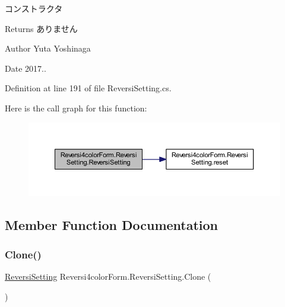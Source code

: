 コンストラクタ 

\begin{DoxyReturn}{Returns}
ありません 
\end{DoxyReturn}
\begin{DoxyAuthor}{Author}
Yuta Yoshinaga 
\end{DoxyAuthor}
\begin{DoxyDate}{Date}
2017.. 
\end{DoxyDate}


Definition at line 191 of file Reversi\+Setting.\+cs.

Here is the call graph for this function\+:
\nopagebreak
\begin{figure}[H]
\begin{center}
\leavevmode
\includegraphics[width=350pt]{class_reversi4color_form_1_1_reversi_setting_a88a0c05a8cc876cc6c8ab87e9514f40b_cgraph}
\end{center}
\end{figure}


\subsection{Member Function Documentation}
\mbox{\label{class_reversi4color_form_1_1_reversi_setting_ab6acecf760ca4ca40ac5d498d56d33b6}} 
\subsubsection{\texorpdfstring{Clone()}{Clone()}}
{\footnotesize\ttfamily \hyperlink{class_reversi4color_form_1_1_reversi_setting}{Reversi\+Setting} Reversi4color\+Form.\+Reversi\+Setting.\+Clone (\begin{DoxyParamCaption}{ }\end{DoxyParamCaption})}



